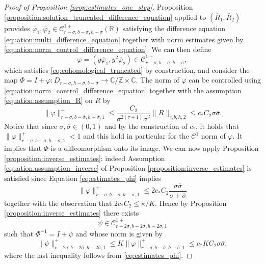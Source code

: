 \documentclass[10pt]{article}
\newcommand{\Z}{\mathbb{Z}}
\newcommand{\R}{\mathbb{R}}
\newcommand{\C}{\mathbb{C}}
\newcommand{\Domain}[3]{D_{#1, #2, #3}}
\begin{document}
\begin{proof}[Proof of Proposition \ref{prop:estimates_one_step}]
Proposition \ref{proposition:solution_truncated_difference_equation} applied to $(\overline R_1, \overline R_2)$ provides $\overline \varphi_1, \overline \varphi_2\in\mathscr C^{1+}_{r-\sigma,b-\overline\sigma,h-\overline\sigma}(\R)$ satisfying the difference equation \eqref{equation:multi_difference_equation} together with norm estimates given by \eqref{equation:norm_control_difference_equation}.
We can then define
\[
\varphi = (y\overline \varphi_1,y^2 \overline \varphi_2) \in \mathscr C^{1+}_{r-\sigma,b-\overline\sigma,h-\overline\sigma},
\]
which satisfies \eqref{eq:cohomological_truncated} by construction, and consider the map
$\Phi = I+\varphi: \Domain{r - \sigma}{h-\overline\sigma}{b-\overline\sigma} \to \C/\Z \times \C$.
The norm of $\varphi$ can be controlled using \eqref{equation:norm_control_difference_equation} together with the assumption \eqref{equation:assumption_R} on $R$ by
\begin{equation}
\label{eq:estimates_phi}
\|\varphi\|_{r-\sigma,b-\overline\sigma,h-\overline\sigma,1}^+ \leq \frac{C_2}{\sigma^{2(\tau+1)}\overline\sigma^2}\|R\|_{r,b,h,2}
\leq c_{\ast}C_2\sigma\overline\sigma.
\end{equation}
Notice that since $\sigma,\overline\sigma\in(0,1)$ and by the construction of $c_\ast$, it holds that $\|\varphi\|_{r-\sigma,b-\overline\sigma,h-\overline\sigma,1}^+<1$ and this hold in particular for the $\mathscr C^1$ norm of $\varphi.$ It implies that $\Phi$ is a diffeomorphism onto its image.
We can now apply Proposition \ref{proposition:inverse_estimates}: indeed Assumption \eqref{equation:assumption_inverse} of Proposition \ref{proposition:inverse_estimates} is satisfied since Equation \eqref{eq:estimates_phi} implies
\[
\|\varphi\|_{r-\sigma,b-\overline\sigma,h-\overline\sigma,1}^+ \leq 2c_{\ast}C_2\frac{\sigma\overline\sigma}{\sigma+\overline\sigma}
\]
together with the observation that $2c_\ast C_2\leq \kappa/K$. Hence by Proposition \ref{proposition:inverse_estimates} there exists
\[
\psi\in\mathscr C^{1+}_{r-2\sigma,b-2\overline\sigma,h-2\overline\sigma,1}
\]
such that $\Phi^{-1} = I+\psi$
and whose norm is given by
\begin{equation}
\label{eq:estimates_psi}
\|\psi\|_{r-2\sigma,b-2\overline\sigma,h-2\overline\sigma,1}^+ \leq 
K\|\varphi\|_{r-\sigma,b-\overline\sigma,h-\overline\sigma,1}^+
\leq c_\ast KC_2
\sigma\overline\sigma,
\end{equation}
where the last inequality follows from \eqref{eq:estimates_phi}.

\vspace{0.2cm}


\end{proof}
\end{document}
